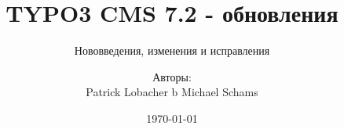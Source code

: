 %

%
%

\documentclass[t]{beamer}

\beamertemplatenavigationsymbolsempty

{
	\usetheme{typo3slides}
}

\title{TYPO3 CMS 7.2 - обновления}
\subtitle{Нововведения, изменения и исправления}
\author{
	\centerline{Авторы:}
	\centerline{Patrick Lobacher b Michael Schams}
}

\date{\today}



\sharefont


\begingroup
	[default]
	\begin{frame}
		\titlepage
	\end{frame}
\endgroup


\section*{TYPO3 CMS 7.2 - обновления}
\begin{frame}[fragile]
	\frametitle{Обзор глав}
	\framesubtitle{Обзор глав}

	\begin{multicols}{2}
		\tableofcontents
	\end{multicols}

\end{frame}

